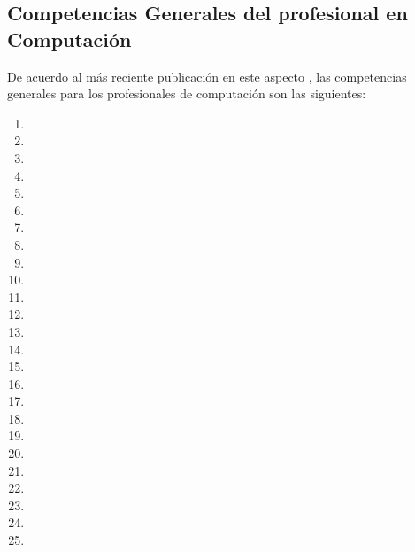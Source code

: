 \subsection{Competencias Generales del profesional en Computación}
De acuerdo al más reciente publicación en este aspecto \cite{IEEECompetences}, las competencias generales para los profesionales de computación son las siguientes:

\begin{enumerate}
\item {}
\item {}
\item {}
\item {}
\item {}
\item {}
\item {}
\item {}
\item {}
\item {}
\item {}
\item {}
\item {}
\item {}
\item {}
\item {}
\item {}
\item {}
\item {}
\item {}
\item {}
\item {}
\item {}
\item {}
\item {}
\end{enumerate}